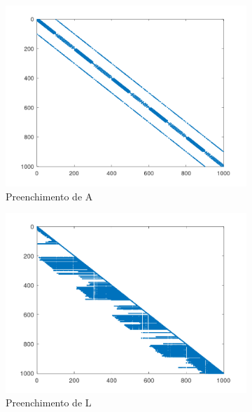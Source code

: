 \documentclass{article}
\begin{document}
\begin{figure}[H]
    \centering
    \begin{subfigure}[b]{0.3\textwidth}
         \centering
         \includegraphics[width=\textwidth]{image/sherman1spyA.png}
         \caption{Preenchimento de A}
         \label{fig:sherman1-spyA}
    \end{subfigure}
    \hfill
    \begin{subfigure}[b]{0.3\textwidth}
         \centering
         \includegraphics[width=\textwidth]{image/sherman1spyL.png}
         \caption{Preenchimento de L}
         \label{fig:sherman1-spyL}
    \end{subfigure}
    \hfill
    \begin{subfigure}[b]{0.3\textwidth}

\end{subfigure}
\end{figure}
\end{document}
